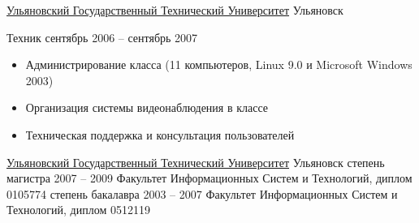 \documentclass[unicode, 10pt, a4paper, oneside, fleqn]{article}
\begin{document}

\job
    {\href{http://www.ulstu.ru}{Ульяновский Государственный Технический Университет}}
    {Ульяновск}
    {
        \position
            {Техник}
            {сентябрь 2006 -- сентябрь 2007}
            {
                \begin{itemize}
                    \item{Администрирование класса (11 компьютеров,
                           Linux 9.0 и Microsoft Windows 2003)}
                    \item{Организация системы видеонаблюдения в классе}
                    \item{Техническая поддержка и консультация пользователей}
                \end{itemize}
            }
    }


\job
    {\href{http://www.ulstu.ru}{Ульяновский Государственный Технический Университет}}
    {Ульяновск}
    {
        \positionnobreak
            {степень магистра}
            {2007 -- 2009}
            {Факультет Информационных Систем и Технологий, диплом  0105774}
        \positionnobreak
            {степень бакалавра}
            {2003 -- 2007}
            {Факультет Информационных Систем и Технологий, диплом  0512119}
    }


\end{document}
